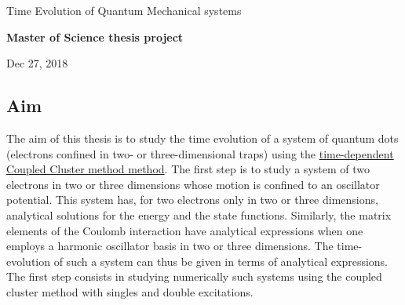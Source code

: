 \documentclass[%
oneside,                 %
final,                   %
10pt]{article}
\begin{document}

\newcommand{\exercisesection}[1]{\subsection*{#1}}






\thispagestyle{empty}

\begin{center}
{\LARGE\bf
\begin{spacing}{1.25}
Time Evolution of Quantum Mechanical systems
\end{spacing}
}
\end{center}


\begin{center}
{\bf Master of Science thesis project${}^{}$} \\ [0mm]
\end{center}

\begin{center}
\end{center}
    

\begin{center}
Dec 27, 2018
\end{center}

\vspace{1cm}


\subsection*{Aim}

The aim of this thesis is to study the time evolution of a system of
quantum dots (electrons confined in two- or three-dimensional traps) using the
\href{{https://github.com/haakoek/PythonVersionMaster/tree/master/Thesis/Chapters}}{time-dependent Coupled Cluster method
method}. The
first step is to study a system of two electrons in two or three
dimensions whose motion is confined to an oscillator potential. This
system has, for two electrons only in two or three dimensions,
analytical solutions for the energy and the state
functions. Similarly, the matrix elements of the Coulomb interaction
have analytical expressions when one employs a harmonic oscillator
basis in two or three dimensions. The time-evolution of such a system
can thus be given in terms of analytical expressions. The first step
consists in studying numerically such systems using the coupled
cluster method with singles and double excitations.  
\end{document}
